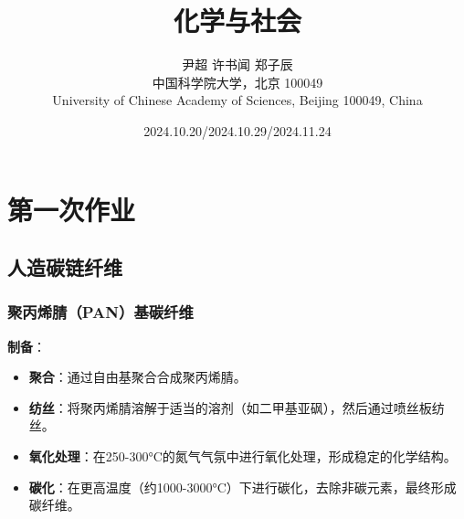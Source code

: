 \documentclass[UTF8]{report}
\title{化学与社会}
\author{尹超 \quad 许书闻 \quad 郑子辰\\ 中国科学院大学，北京 100049 \\ \large University of Chinese Academy of Sciences, Beijing 100049, China}
\date{2024.10.20/2024.10.29/2024.11.24}
\theoremstyle{MyLineTheoremStyle} %
\theoremstyle{MyBlockTheoremStyle} %
\theoremstyle{MySubsubsectionStyle} %
\newcommand{\cnabstractname}{序言}
\newenvironment{cnabstract}{%
            \par\Large
            \noindent\mbox{}\hfill{\bfseries \cnabstractname}\hfill\mbox{}\par
            \vskip 2.5ex
            }{\par\vskip 2.5ex}
\begin{document}


\maketitle\newpage  
{} %
\thispagestyle{fancy}   %


\setcounter{tocdepth}{4}                %
\tableofcontents                        %
\thispagestyle{fancy}                   %

\newpage    
{} 




\chapter{第一次作业}

\section{人造碳链纤维}

\subsection{聚丙烯腈（PAN）基碳纤维}
\textbf{制备}：
\begin{itemize}
    \item \textbf{聚合}：通过自由基聚合合成聚丙烯腈。
    \item \textbf{纺丝}：将聚丙烯腈溶解于适当的溶剂（如二甲基亚砜），然后通过喷丝板纺丝。
    \item \textbf{氧化处理}：在250-300°C的氮气气氛中进行氧化处理，形成稳定的化学结构。
    \item \textbf{碳化}：在更高温度（约1000-3000°C）下进行碳化，去除非碳元素，最终形成碳纤维。
\end{itemize}
\end{document}
